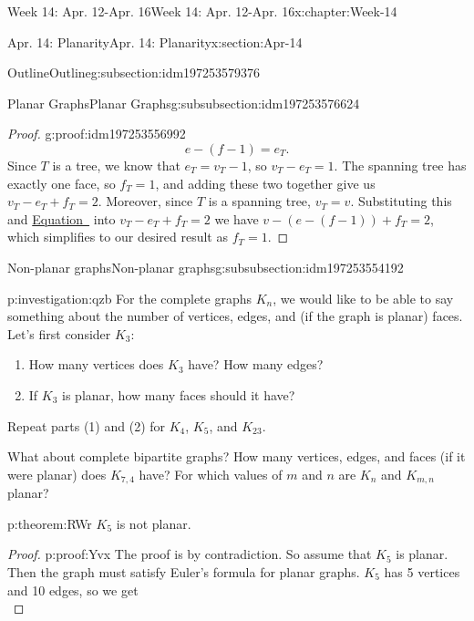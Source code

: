 \documentclass[oneside,10pt,]{book}
\numberwithin{equation}{section}
\begin{document}
\begin{chapterptx}{Week 14: Apr. 12-Apr. 16}{}{Week 14: Apr. 12-Apr. 16}{}{}{x:chapter:Week-14}
\begin{sectionptx}{Apr. 14: Planarity}{}{Apr. 14: Planarity}{}{}{x:section:Apr-14}
\begin{subsectionptx}{Outline}{}{Outline}{}{}{g:subsection:idm197253579376}
\begin{subsubsectionptx}{Planar Graphs}{}{Planar Graphs}{}{}{g:subsubsection:idm197253576624}
\begin{proof}{}{g:proof:idm197253556992}
\begin{equation*}
e - (f-1) = e_T\text{.}
\end{equation*}
Since \(T\) is a tree, we know that \(e_T = v_T - 1\), so \(v_T - e_T = 1\). The spanning tree has exactly one face, so \(f_T = 1\), and adding these two together give us \(v_T - e_T + f_T = 2\). Moreover, since \(T\) is a spanning tree, \(v_T = v\). Substituting this and \hyperref[x:me:eq-euler-formula-proof1]{Equation~} into \(v_T - e_T + f_T = 2\) we have \(v - (e-(f-1))+f_T = 2\), which simplifies to our desired result as \(f_T = 1\).%
\end{proof}
\end{subsubsectionptx}
%
%
\typeout{************************************************}
\typeout{************************************************}
%
\begin{subsubsectionptx}{Non-planar graphs}{}{Non-planar graphs}{}{}{g:subsubsection:idm197253554192}
%
%
\begin{investigation}{}{p:investigation:qzb}%
For the complete graphs \(K_n\), we would like to be able to say something about the number of vertices, edges, and (if the graph is planar) faces. Let's first consider \(K_3\):%
\begin{enumerate}
\item{}How many vertices does \(K_3\) have? How many edges?%
\item{}If \(K_3\) is planar, how many faces should it have?%
\end{enumerate}
%
\par
Repeat parts (1) and (2) for \(K_4\), \(K_5\), and \(K_{23}\).%
\par
What about complete bipartite graphs? How many vertices, edges, and faces (if it were planar) does \(K_{7,4}\) have? For which values of \(m\) and \(n\) are \(K_n\) and \(K_{m,n}\) planar?%
\end{investigation}%
\begin{theorem}{}{}{p:theorem:RWr}%
%
%
\(K_5\) is not planar.%
\end{theorem}
\begin{proof}{}{p:proof:Yvx}
The proof is by contradiction. So assume that \(K_5\) is planar. Then the graph must satisfy Euler's formula for planar graphs. \(K_5\) has 5 vertices and 10 edges, so we get%
\begin{equation*}

\end{equation*}
\end{proof}
\end{subsubsectionptx}
\end{subsectionptx}
\end{sectionptx}
\end{chapterptx}
\end{document}
